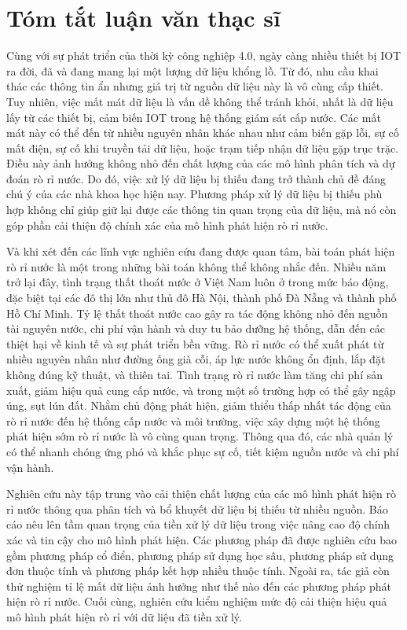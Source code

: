 \chapter*{Tóm tắt luận văn thạc sĩ}
Cùng với sự phát triển của thời kỳ công nghiệp 4.0, ngày càng nhiều thiết bị IOT ra đời, đã và đang mang lại một lượng dữ liệu khổng lồ. Từ đó, nhu cầu khai thác các thông tin ẩn nhưng giá trị từ nguồn dữ liệu này là vô cùng cấp thiết. Tuy nhiên, việc mất mát dữ liệu là vấn dề không thể tránh khỏi, nhất là dữ liệu lấy từ các thiết bị, cảm biến IOT trong hệ thống giám sát cấp nước. Các mất mát này có thể đến từ nhiều nguyên nhân khác nhau như cảm biến gặp lỗi, sự cố mất điện, sự cố khi truyền tải dữ liệu, hoặc trạm tiếp nhận dữ liệu gặp trục trặc. Điều này ảnh hưởng không nhỏ đến chất lượng của các mô hình phân tích và dự đoán rò rỉ nước. Do đó, việc xử lý dữ liệu bị thiếu đang trở thành chủ đề đáng chú ý của các nhà khoa học hiện nay. Phương pháp xử lý dữ liệu bị thiếu phù hợp không chỉ giúp giữ lại được các thông tin quan trọng của dữ liệu, mà nó còn góp phần cải thiện độ chính xác của mô hình phát hiện rò rỉ nước.

Và khi xét đến các lĩnh vực nghiên cứu đang được quan tâm, bài toán phát hiện rò rỉ nước là một trong những bài toán không thể không nhắc đến. Nhiều năm trở lại đây, tình trạng thất thoát nước ở Việt Nam luôn ở trong mức báo động, đặc biệt tại các đô thị lớn như thủ đô Hà Nội, thành phố Đà Nẵng và thành phố Hồ Chí Minh. Tỷ lệ thất thoát nước cao gây ra tác động không nhỏ đến nguồn tài nguyên nước, chi phí vận hành và duy tu bảo dưỡng hệ thống, dẫn đến các thiệt hại về kinh tế và sự phát triển bền vững. Rò rỉ nước có thể xuất phát từ nhiều nguyên nhân như đường ống già cỗi, áp lực nước không ổn định, lắp đặt không đúng kỹ thuật, và thiên tai. Tình trạng rò rỉ nước làm tăng chi phí sản xuất, giảm hiệu quả cung cấp nước, và trong một số trường hợp có thể gây ngập úng, sụt lún đất. Nhằm chủ động phát hiện, giảm thiểu thấp nhất tác động của rò rỉ nước đến hệ thống cấp nước và môi trường, việc xây dựng một hệ thống phát hiện sớm rò rỉ nước là vô cùng quan trọng. Thông qua đó, các nhà quản lý có thể nhanh chóng ứng phó và khắc phục sự cố, tiết kiệm nguồn nước và chi phí vận hành.

Nghiên cứu này tập trung vào cải thiện chất lượng của các mô hình phát hiện rò rỉ nước thông qua phân tích và bổ khuyết dữ liệu bị thiếu từ nhiều nguồn. Báo cáo nêu lên tầm quan trọng của tiền xử lý dữ liệu trong việc nâng cao độ chính xác và tin cậy cho mô hình phát hiện. Các phương pháp đã được nghiên cứu bao gồm phương pháp cổ điển, phương pháp sử dụng học sâu, phương pháp sử dụng đơn thuộc tính và phương pháp kết hợp nhiều thuộc tính. Ngoài ra, tác giả còn thử nghiệm tỉ lệ mất dữ liệu ảnh hưởng như thế nào đến các phương pháp phát hiện rò rỉ nước. Cuối cùng, nghiên cứu kiểm nghiệm mức độ cải thiện hiệu quả mô hình phát hiện rò rỉ với dữ liệu đã tiền xử lý.